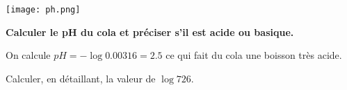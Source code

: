 \documentclass[12pt,a4paper,oneside,dvipsnames,table,svgnames,skins,theorems]{report}
\begin{document}
\begin{center}
\texttt{[image: ph.png]}
\end{center}
\vspace{-0.5cm}
\textbf{Calculer le pH du cola et préciser s'il est acide ou basique.
}
\begin{correction}
On calcule $pH= -\log 0.00316 = 2.5$ ce qui fait du cola une boisson très acide.
\end{correction}
\finexo
%
%
%
%
%
%
%
\vspace{0.1cm}

\exo{} Calculer, en détaillant, la valeur de $\log 726$.
\vspace{0.2cm}
\end{document}
